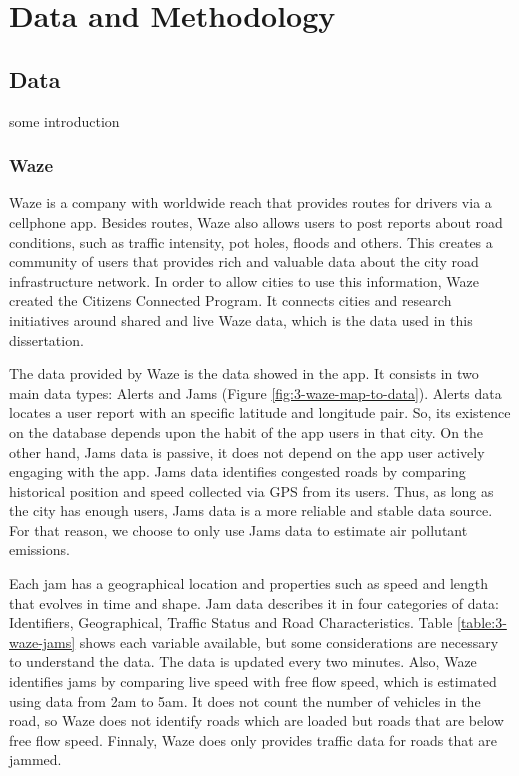 

\chapter{Data and Methodology}
\label{chap:Style}

\section{Data}
some introduction

\subsection{Waze}


Waze is a company with worldwide reach that provides routes for drivers via a cellphone app. Besides routes, Waze also allows users to post reports about road conditions, such as traffic intensity, pot holes, floods and others. This creates a community of users that provides rich and valuable data about the city road infrastructure network. In order to allow cities to use this information, Waze created the Citizens Connected Program. It connects cities and research initiatives around shared and live Waze data, which is the data used in this dissertation.

The data provided by Waze is the data showed in the app. It consists in two main data types: Alerts and Jams (Figure \ref{fig:3-waze-map-to-data}). Alerts data locates a user report with an specific latitude and longitude pair. So, its existence on the database depends upon the habit of the app users in that city. On the other hand, Jams data is passive, it does not depend on the app user actively engaging with the app. Jams data identifies congested roads by comparing historical position and speed collected via GPS from its users. Thus, as long as the city has enough users, Jams data is a more reliable and stable data source. For that reason, we choose to only use Jams data to estimate air pollutant emissions.

Each jam has a geographical location and properties such as speed and length that evolves in time and shape. Jam data describes it in four categories of data: Identifiers, Geographical, Traffic Status and Road Characteristics. Table \ref{table:3-waze-jams} shows each variable available, but some considerations are necessary to understand the data. The data is updated every two minutes. Also, Waze identifies jams by comparing live speed with free flow speed, which is estimated using data from 2am to 5am. It does not count the number of vehicles in the road, so Waze does not identify roads which are loaded but roads that are below free flow speed. Finnaly, Waze does only provides traffic data for roads that are jammed.

